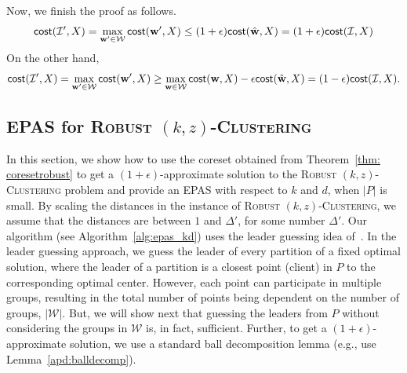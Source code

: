 \documentclass[11pt]{article}
\newcommand{\cost}{\ensuremath{\textsf{cost}}}
\newcommand{\rkc}{\textsc{Robust $(k,z)$-Clustering}\xspace}
\newcommand{\vcw}{{\bf w}\xspace}
\newcommand{\cI}{\ensuremath{\mathcal{I}}\xspace}
\newcommand{\cW}{\ensuremath{\mathcal{W}}\xspace}
\begin{document}
    Now, we finish the proof as follows.
    \[
                \cost(\cI',X) = \max_{\vcw' \in \cW} \cost(\vcw',X) \le (1+\epsilon) \cost(\hat{\vcw},X) = (1+\epsilon) \cost(\cI,X)
    \]
    On the other hand,
    \[
             \cost(\cI',X) = \max_{\vcw' \in \cW} \cost(\vcw',X) \ge \max_{\vcw \in \cW} \cost(\vcw,X) - \epsilon \cost(\hat{\vcw},X) = (1-\epsilon) \cost(\cI,X).
    \]






\subsection{EPAS for \rkc} \label{ss:pas_kd_sfc}
In this section, we show how to use the coreset obtained from Theorem~\ref{thm: coresetrobust} to get a $(1+\epsilon)$-approximate solution to the \rkc problem and provide an EPAS with respect to $k$ and $d$, when $|P|$ is small. 
By scaling the distances in the instance of \rkc, we assume that the distances are between $1$ and $\Delta'$, for some number $\Delta'$.
Our algorithm (see Algorithm~\ref{alg:epas_kd}) uses the leader guessing idea of~\cite{cohenaddad_et_al:LIPIcs:2019:10618}. In the leader guessing approach, we guess the leader of every partition of a fixed optimal solution, where the leader of a partition is a closest point (client) in $P$ to the corresponding optimal center. However, each point can participate in multiple groups, resulting in the total number of points being dependent on the number of groups, $|\cW|$.
But, we will show next that guessing the leaders from $P$ without considering the groups in $\cW$ is, in fact, sufficient. Further, to get a $(1+\epsilon)$-approximate solution, we use a standard ball decomposition lemma (e.g., use Lemma~\ref{apd:balldecomp}). 
\end{document}
